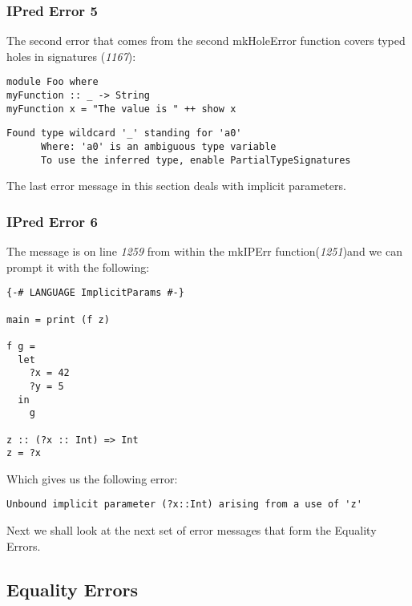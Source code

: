 \documentclass[a4paper]{article}
\begin{document}
\subsubsection{IPred Error 5}
The second error that comes from the second mkHoleError function covers typed holes in signatures (\textit{1167}):

\begin{lstlisting}[label={lst: T5.0}, numbers=none, caption={Example Program \cite{ex5}}]
module Foo where
myFunction :: _ -> String
myFunction x = "The value is " ++ show x
\end{lstlisting}

\begin{lstlisting}[label={lst: T5.0.2}, numbers=none, caption={Error}]
Found type wildcard '_' standing for 'a0'
      Where: 'a0' is an ambiguous type variable
      To use the inferred type, enable PartialTypeSignatures
\end{lstlisting}

The last error message in this section deals with implicit parameters. 

\subsubsection{IPred Error 6}
The message is on line \textit{1259} from within the mkIPErr function(\textit{1251})and we can prompt it with the following:

\begin{lstlisting}[label={lst: T6.0}, numbers=none, caption={Example Program \cite{ex6}}]
{-# LANGUAGE ImplicitParams #-}

main = print (f z)

f g =
  let 
    ?x = 42
    ?y = 5
  in
    g

z :: (?x :: Int) => Int
z = ?x
\end{lstlisting}

Which gives us the following error:

\begin{lstlisting}[label={lst: T6.0.2}, numbers=none, caption={Error}]
Unbound implicit parameter (?x::Int) arising from a use of 'z'
\end{lstlisting}

Next we shall look at the next set of error messages that form the Equality Errors.

\subsection{Equality Errors}
\end{document}
